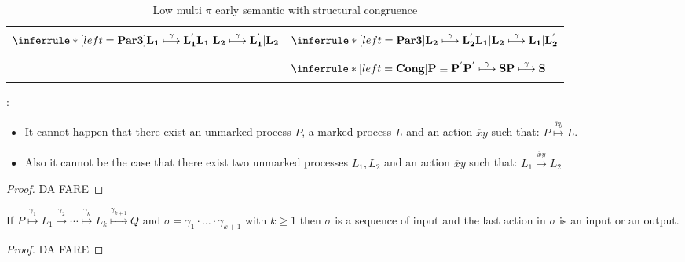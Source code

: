 \begin{definition}
\begin{table}
\begin{tabular}{ll}
      \\\\
	  $\inferrule* [left=\bf{Par3}]{
	      L_{1} \stackrel{\gamma}{\longmapsto} L_{1}^{'}
	  }{
	      L_{1}|L_{2} \stackrel{\gamma}{\longmapsto} L_{1}^{'}|L_{2}
	  }$
	&
	  $\inferrule* [left=\bf{Par3}]{
	      L_{2} \stackrel{\gamma}{\longmapsto} L_{2}^{'}
	  }{
	      L_{1}|L_{2} \stackrel{\gamma}{\longmapsto} L_{1}|L_{2}^{'}
	  }$
      \\\\\\
	&
	  $\inferrule* [left=\bf{Cong}]{
	      P\equiv P^{'}
	    \\
	      P^{'} \stackrel{\gamma}{\longmapsto} S
	  }{
	      P \stackrel{\gamma}{\longmapsto} S
	  }$
      \\\\\hline
    \end{tabular}
    \caption{Low multi $\pi$ early semantic with structural congruence}
    \label{lowleveltransitionrelation}
  \end{table}
\end{definition}

\begin{lemma}\label{lemmacom3}
  :\begin{itemize}
    \item
      It cannot happen that there exist an unmarked process $P$, a marked process $L$ and an action $\overline{x}y$ such that: $P\stackrel{\overline{x}y}{\longmapsto}L$. 
    \item
      Also it cannot be the case that there exist two unmarked processes $L_{1}, L_{2}$ and an action $\overline{x}y$ such that: $L_{1}\stackrel{\overline{x}y}{\longmapsto}L_{2}$
  \end{itemize}
  \begin{proof}
    DA FARE
  \end{proof}
\end{lemma}

\begin{lemma}\label{lemmalabellowhigh}
  If $P\stackrel{\gamma_{1}}{\longmapsto} L_{1} \stackrel{\gamma_{2}}{\longmapsto} \cdots  \stackrel{\gamma_{k}}{\longmapsto} L_{k} \stackrel{\gamma_{k+1}}{\longmapsto} Q$ and $\sigma = \gamma_{1}\cdot \ldots \cdot \gamma_{k+1}$ with $k\geq 1$ then $\sigma$ is a sequence of input and the last action in $\sigma$ is an input or an output.
  \begin{proof}
    DA FARE
  \end{proof}
\end{lemma}

